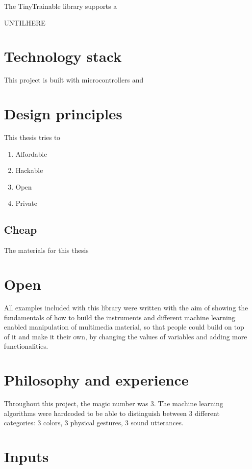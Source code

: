 The TinyTrainable library supports a 

UNTILHERE

\section{Technology stack}

This project is built with microcontrollers and 

\section{Design principles}

This thesis tries to 

\begin{enumerate}
  \item Affordable
  \item Hackable
  \item Open
  \item Private
\end{enumerate}

\subsection{Cheap}

The materials for this thesis 


\section{Open}

All examples included with this library were written with the aim of showing the fundamentals of how to build the instruments and different machine learning enabled manipulation of multimedia material, so that people could build on top of it and make it their own, by changing the values of variables and adding more functionalities.

\section{Philosophy and experience}

Throughout this project, the magic number was 3. The machine learning algorithms were hardcoded to be able to distinguish between 3 different categories: 3 colors, 3 physical gestures, 3 sound utterances.

\section{Inputs}

